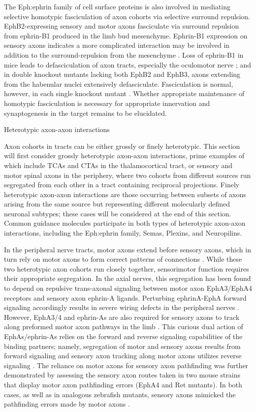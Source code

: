 The Eph:ephrin family of cell surface proteins is also involved in mediating selective homotypic fasciculation of axon cohorts via selective surround repulsion.
EphB2-expressing sensory and motor axons fasciculate via surround repulsion from ephrin-B1 produced in the limb bud mesenchyme.
Ephrin-B1 expression on sensory axons indicates a more complicated interaction may be involved in addition to the surround-repulsion from the mesenchyme \cite{luxey2013eph}.
Loss of ephrin-B1 in mice leads to defasciculation of axon tracts, especially the oculomotor nerve \cite{davy2004ephrin}; and in double knockout mutants lacking both EphB2 and EphB3, axons extending from the habenular nuclei extensively defasciculate.
Fasciculation is normal, however, in each single knockout mutant \cite{orioli1996sek4}.
Whether appropriate maintenance of homotypic fasciculation is necessary for appropriate innervation and synaptogenesis in the target remains to be elucidated.


Heterotypic axon-axon interactions

Axon cohorts in tracts can be either grossly or finely heterotypic.
This section will first consider grossly heterotypic axon-axon interactions, prime examples of which include TCAs and CTAs in the thalamocortical tract, or sensory and motor spinal axons in the periphery, where two cohorts from different sources run segregated from each other in a tract containing reciprocal projections.
Finely heterotypic axon-axon interactions are those occurring between subsets of axons arising from the same source but representing different molecularly defined neuronal subtypes; these cases will be considered at the end of this section.
Common guidance molecules participate in both types of heterotypic axon-axon interactions, including the Eph:ephrin family, Semas, Plexins, and Neuropilins. 

In the peripheral nerve tracts, motor axons extend before sensory axons, which in turn rely on motor axons to form correct patterns of connections \cite{wang2013axons}.
While these two heterotypic axon cohorts run closely together, sensorimotor function requires their appropriate segregation.
In the axial nerves, this segregation has been found to depend on repulsive trans-axonal signaling between motor axon EphA3/EphA4 receptors and sensory axon ephrin-A ligands.
Perturbing ephrinA-EphA forward signaling accordingly results in severe wiring defects in the peripheral nerves \cite{gallarda2008segregation}.
However, EphA3/4 and ephrin-As are also required for sensory axons to track along preformed motor axon pathways in the limb \cite{wang2011anatomical}.
This curious dual action of EphAs/ephrin-As relies on the forward and reverse signaling capabilities of the binding partners; namely, segregation of motor and sensory axons results from forward signaling and sensory axon tracking along motor axons utilizes reverse signaling \cite{wang2011anatomical}.
The reliance on motor axons for sensory axon pathfinding was further demonstrated by assessing the sensory axon routes taken in two mouse strains that display motor axon pathfinding errors (EphA4 and Ret mutants).
In both cases, as well as in analogous zebrafish mutants, sensory axons mimicked the pathfinding errors made by motor axons \cite{wang2014conserved}. 

